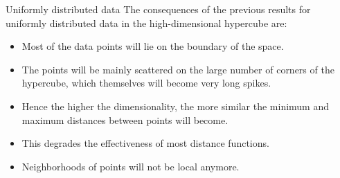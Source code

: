 \documentclass[11pt,compress,t,notes=noshow, xcolor=table]{beamer}
\begin{document}
\begin{vbframe}{Uniformly distributed data}
The consequences of the previous results for uniformly distributed data in the high-dimensional hypercube are:

\medskip

\begin{itemize}
\item Most of the data points will lie on the boundary of the space.
\item The points will be mainly scattered on the large number of corners of the hypercube, which themselves will become very long spikes.
\item Hence the higher the dimensionality, the more similar the minimum and maximum distances between points will become.
\item This degrades the effectiveness of most distance functions.
\item Neighborhoods of points will not be local anymore.
\end{itemize}

\end{vbframe}
\end{document}
